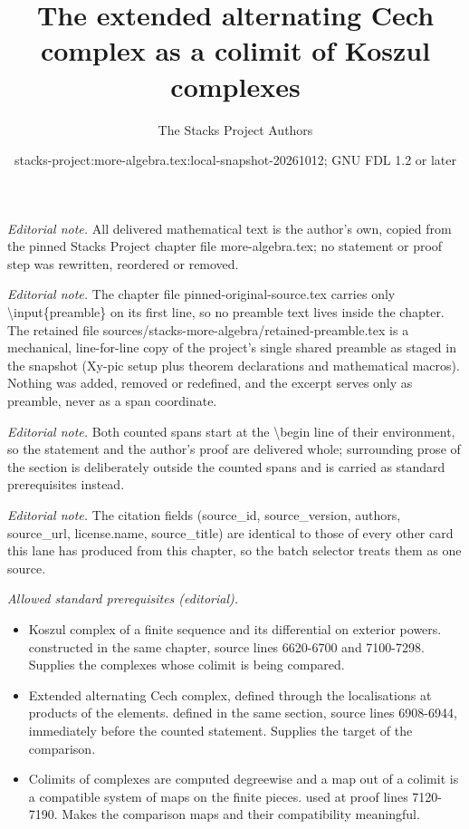 \documentclass[10pt,a4paper]{amsart}
\title{The extended alternating Cech complex as a colimit of Koszul complexes}
\author{The Stacks Project Authors}
\date{stacks-project:more-algebra.tex:local-snapshot-20261012; GNU FDL 1.2 or later}
\theoremstyle{plain}
\theoremstyle{definition}
\theoremstyle{remark}
\numberwithin{equation}{subsection}
\begin{document}
\maketitle
\setcounter{subsection}{1}
\noindent\textit{Editorial note.} All delivered mathematical text is the author's own, copied from the pinned Stacks Project chapter file more-algebra.tex; no statement or proof step was rewritten, reordered or removed.\par\medskip
\noindent\textit{Editorial note.} The chapter file pinned-original-source.tex carries only \textbackslash{}input\{preamble\} on its first line, so no preamble text lives inside the chapter. The retained file sources/stacks-more-algebra/retained-preamble.tex is a mechanical, line-for-line copy of the project's single shared preamble as staged in the snapshot (Xy-pic setup plus theorem declarations and mathematical macros). Nothing was added, removed or redefined, and the excerpt serves only as preamble, never as a span coordinate.\par\medskip
\noindent\textit{Editorial note.} Both counted spans start at the \textbackslash{}begin line of their environment, so the statement and the author's proof are delivered whole; surrounding prose of the section is deliberately outside the counted spans and is carried as standard prerequisites instead.\par\medskip
\noindent\textit{Editorial note.} The citation fields (source\_id, source\_version, authors, source\_url, license.name, source\_title) are identical to those of every other card this lane has produced from this chapter, so the batch selector treats them as one source.\par\medskip
\noindent\textit{Allowed standard prerequisites (editorial).}\begin{itemize}
\item Koszul complex of a finite sequence and its differential on exterior powers. constructed in the same chapter, source lines 6620-6700 and 7100-7298. Supplies the complexes whose colimit is being compared.
\item Extended alternating Cech complex, defined through the localisations at products of the elements. defined in the same section, source lines 6908-6944, immediately before the counted statement. Supplies the target of the comparison.
\item Colimits of complexes are computed degreewise and a map out of a colimit is a compatible system of maps on the finite pieces. used at proof lines 7120-7190. Makes the comparison maps and their compatibility meaningful.
\end{itemize}\medskip
\end{document}
